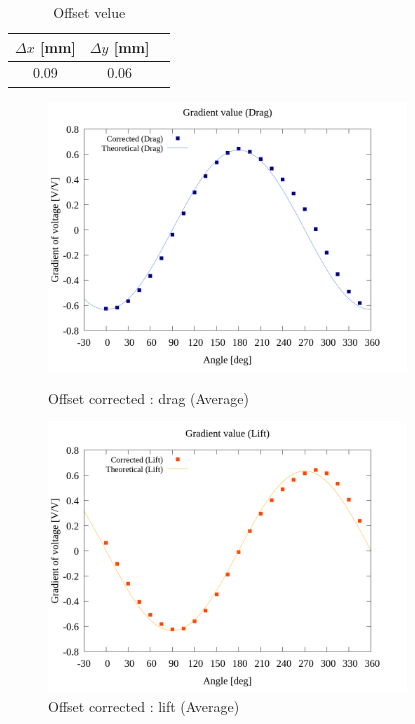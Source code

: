 \begin{table}[htbp]
  \begin{center}
      \caption{Offset velue}
      \begin{tabular}{|p{30mm}|p{20mm}|p{20mm}|}
          \hline
          \multicolumn{1}{|c|}{$\Delta x$ [mm]} & \multicolumn{1}{|c|}{$\Delta y$ [mm]} \\ \hline
          \multicolumn{1}{|c|}{0.09}           & \multicolumn{1}{|c|}{0.06}           \\ \hline
      \end{tabular}
  \end{center}
\end{table}

\begin{figure}[htbp]
		\centering
		\includegraphics[width=95mm]{../../02_workspace/result/2-ex/plot/21/21-2_corrected_offset_drag.png}
		\caption{Offset corrected : drag (Average)}
		\includegraphics[width=95mm]{../../02_workspace/result/2-ex/plot/21/21-2_corrected_offset_lift.png}
		\caption{Offset corrected : lift (Average)}
\end{figure}

\newpage


